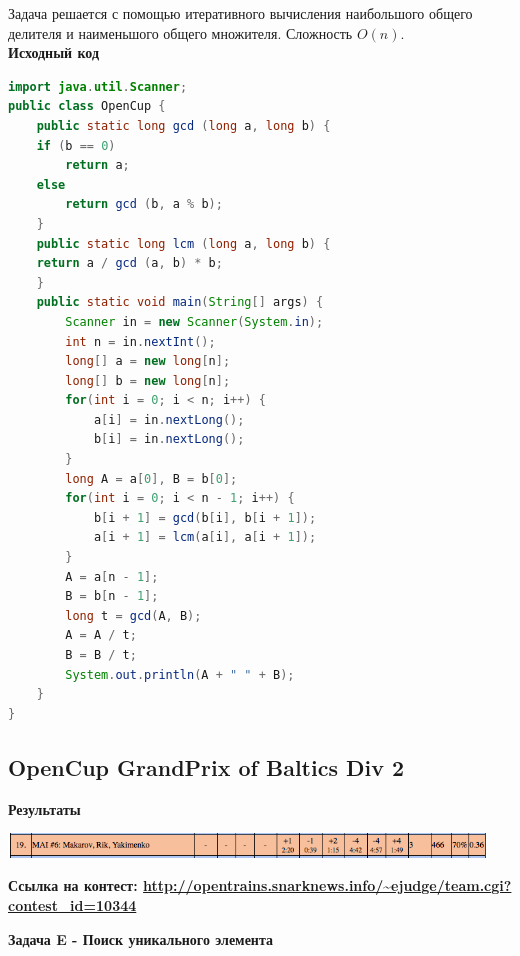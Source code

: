 \documentclass[a4paper,12pt]{article}
\begin{document}
Задача решается с помощью итеративного вычисления наибольшого общего делителя и наименьшого общего множителя. Сложность $O(n)$. \\
\newpage
\textbf{{\large Исходный код}} \\
\begin{lstlisting}[language=Java]
import java.util.Scanner;
public class OpenCup {
    public static long gcd (long a, long b) {
	if (b == 0)
		return a;
	else
		return gcd (b, a % b);
    }
    public static long lcm (long a, long b) {
	return a / gcd (a, b) * b;
    }
    public static void main(String[] args) {
        Scanner in = new Scanner(System.in);
        int n = in.nextInt();
        long[] a = new long[n];
        long[] b = new long[n];
        for(int i = 0; i < n; i++) {
            a[i] = in.nextLong();
            b[i] = in.nextLong();            
        }
        long A = a[0], B = b[0];
        for(int i = 0; i < n - 1; i++) {
            b[i + 1] = gcd(b[i], b[i + 1]);
            a[i + 1] = lcm(a[i], a[i + 1]);
        }
        A = a[n - 1];
        B = b[n - 1];
        long t = gcd(A, B);
        A = A / t;
        B = B / t;
        System.out.println(A + " " + B);
    }
}
\end{lstlisting}






%
%
\newpage
\subsection{OpenCup GrandPrix of Baltics Div 2}

\textbf{{\large Результаты}} \\
\begin{center}
\includegraphics[width=0.95\textwidth]{OC_Baltics/result.png}\\ [1cm]
\end{center}

\textbf{{\large Ссылка на контест: \url{http://opentrains.snarknews.info/~ejudge/team.cgi?contest_id=10344}}}

\newpage
\textbf{{\large Задача E - Поиск уникального элемента}}
\end{document}
